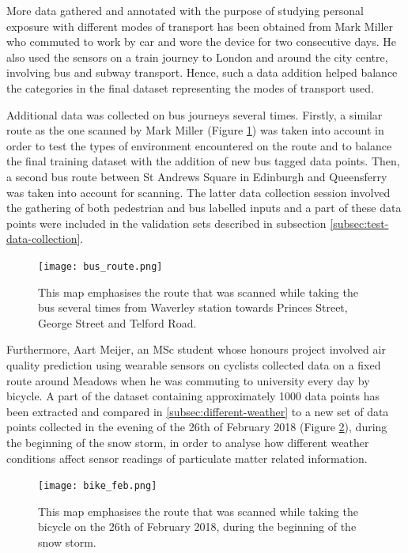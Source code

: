 \documentclass[bsc,frontabs,twoside,singlespacing, parskip,deptreport]{infthesis}     %
\begin{document}
More data gathered and annotated with the purpose of studying personal exposure with different modes of transport has been obtained from Mark Miller who commuted to work by car and wore the device for two consecutive days. He also used the sensors on a train journey to London and around the city centre, involving bus and subway transport. Hence, such a data addition helped balance the categories in the final dataset representing the modes of transport used.

Additional data was collected on bus journeys several times. Firstly, a similar route as the one scanned by Mark Miller (Figure \ref{fig:bus_route}) was taken into account in order to test the types of environment encountered on the route and to balance the final training dataset with the addition of new bus tagged data points. Then, a second bus route between St Andrews Square in Edinburgh and Queensferry was taken into account for scanning. The latter data collection session involved the gathering of both pedestrian and bus labelled inputs and a part of these data points were included in the validation sets described in subsection \ref{subsec:test-data-collection}.

\begin{figure}[h!]
  \center
  \texttt{[image: bus\_route.png]} 
  \caption{This map emphasises the route that was scanned while taking the bus several times from Waverley station towards Princes Street, George Street and Telford Road.}
  \label{fig:bus_route}
\end{figure}

Furthermore, Aart Meijer, an MSc student whose honours project involved air quality prediction using wearable sensors on cyclists \cite{Meijer2015} collected data on a fixed route around Meadows when he was commuting to university every day by bicycle. A part of the dataset containing approximately 1000 data points has been extracted and compared in \ref{subsec:different-weather} to a new set of data points collected in the evening of the 26th of February 2018 (Figure \ref{fig:february-bike}), during the beginning of the snow storm, in order to analyse how different weather conditions affect sensor readings of particulate matter related information.

\begin{figure}[h!]
  \center
  \texttt{[image: bike\_feb.png]} 
  \caption{This map emphasises the route that was scanned while taking the bicycle on the 26th of February 2018, during the beginning of the snow storm.}
  \label{fig:february-bike}
\end{figure}
\end{document}
